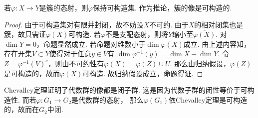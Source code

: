     \begin{theorem}[Chevalley]
        若$\varphi\colon X \rightarrow Y$是簇的态射，则$\varphi$保持可构造集. 
        作为推论，簇的像是可构造的.
    \end{theorem}
    \begin{proof}
        由于可构造集对有限并封闭，故不妨设$X$不可约. 
        由于$X$的相对闭集也是簇，故只需证$\varphi(X)$可构造. 
        若$\varphi$不是支配态射，则将$Y$缩小至$\overline{\varphi(X)}$. 
        对$\dim Y =0$，命题显然成立. 若命题对维数小于$\dim\varphi(X)$成立.
        由上述内容知，存在开集$V \subset Y$使得对于任意$y \in V$有
        $\dim \varphi^{-1}(y) = \dim X - \dim Y$.
        令$Z = \varphi^{-1}(V)^{c}$，则由不可约性有$\varphi(X)=\varphi(Z) \cup U$. 
        那么由归纳假设，$\varphi(Z)$是可构造的，故而$\varphi(X)$可构造. 
        故归纳假设成立，命题得证.
    \end{proof}

    \begin{example}
        Chevalley定理证明了代数群的像都是闭子群. 这是因为代数子群的闭性等价于可构造性. 
        而若$\varphi\colon G_{1} \rightarrow G_{2}$是代数群的态射，
        那么$\varphi(G_{1})$依Chevalley定理是可构造的，故而在$G_{2}$中闭.
    \end{example}